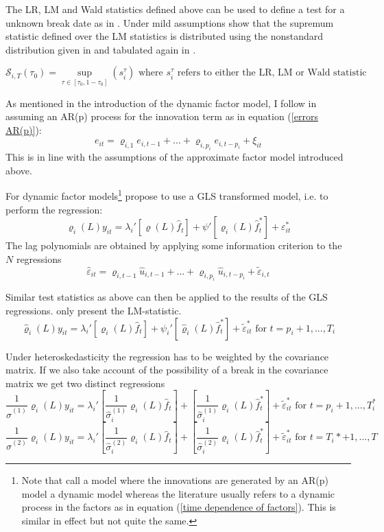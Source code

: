 \documentclass[12pt]{article}
\begin{document}
The LR, LM and Wald statistics defined above can be used to define a test for a unknown break date as in \citet{andrews1993tests}. Under mild assumptions \citet{breitung2011testing} show that the supremum statistic defined over the LM statistics is distributed using the nonstandard distribution given in \citet{andrews1993tests} and tabulated again in \citet{andrews2003tests}.

\begin{equation}
\label{sup LM statistic}
\mathscr{S}_{i,T}(\tau_0) = \sup_{\tau \in [\tau_0, 1-\tau_0]} (s_i^\tau) \text{ where $s_i^\tau$ refers to either the LR, LM or Wald statistic}
\end{equation}



As mentioned in the introduction of the dynamic factor model, I follow \citet{breitung2011testing} in assuming an AR(p) process for the innovation term as in equation (\ref{errors AR(p)}):
\begin{equation}
	\label{errors AR(p)}
	e_{it} = \varrho_{i, 1} e_{i, t-1} + ... + \varrho_{i, p_i} e_{i, t-p_i} + \xi_{it}
\end{equation}
This is in line with the assumptions of the approximate factor model introduced above.

For dynamic factor models\footnote{Note that \citet{breitung2011testing} call a model where the innovations are generated by an AR(p) model a dynamic model whereas the literature usually refers to a dynamic process in the factors as in equation (\ref{time dependence of factors}). This is similar in effect but not quite the same.} \citet{breitung2011testing} propose to use a GLS transformed model, i.e. to perform the regression:
$$\varrho_i(L) y_{it} = \lambda_i'[\varrho(L) \hat f_t] + \psi' [\varrho_i(L) \hat f_t^*] + \varepsilon^*_{it}$$
The lag polynomials are obtained by applying some information criterion to the $N$ regressions
$$\hat \varepsilon_{it} = \varrho_{i, t-1} \hat u_{i, t-1} + ... + \varrho_{i, p_i} \hat u_{i, t-p_i} + \tilde \varepsilon_{i,t}$$

Similar test statistics as above can then be applied to the results of the GLS regressions. \citet{breitung2011testing} only present the LM-statistic.
$$\hat \varrho_i(L) y_{it} = \lambda_i' \left[\varrho_i(L) \hat f_t\right] + \psi_i' \left[\hat \varrho_i(L) \hat f_t^*\right] + \tilde \varepsilon^*_{it} \text{ for } t= p_i+1, ..., T_i$$

Under heteroskedasticity the regression has to be weighted by the covariance matrix. If we also take account of the possibility of a break in the covariance matrix we get two distinct regressions
$$\frac{1}{\hat \sigma^{(1)}} \varrho_i(L) y_{it} = \lambda_i' \left[\frac{1}{\hat \sigma_i^{(1)}} \varrho_i(L) \hat f_t\right] + \left[\frac{1}{\hat \sigma_i^{(1)}} \varrho_i(L) \hat f_t^*\right] + \tilde \varepsilon^*_{it} \text{ for } t = p_i+1, ..., T^*_i$$
$$\frac{1}{\hat \sigma^{(2)}} \varrho_i(L) y_{it} = \lambda_i' \left[\frac{1}{\hat \sigma_i^{(2)}} \varrho_i(L) \hat f_t\right] + \left[\frac{1}{\hat \sigma_i^{(2)}} \varrho_i(L) \hat f_t^*\right] + \tilde \varepsilon^*_{it} \text{ for } t = T_i*+1, ..., T$$
\end{document}
